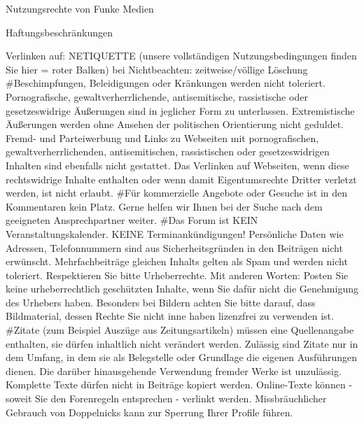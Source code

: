 Nutzungsrechte von Funke Medien 

Haftungsbeschränkungen



Verlinken auf:
NETIQUETTE (unsere vollständigen Nutzungsbedingungen finden Sie hier = roter Balken) 
bei Nichtbeachten: zeitweise/völlige Löschung
    #Beschimpfungen, Beleidigungen oder Kränkungen werden nicht toleriert.
    Pornografische, gewaltverherrlichende, antisemitische, rassistische oder gesetzeswidrige Äußerungen sind in jeglicher Form zu unterlassen. Extremistische Äußerungen werden ohne Ansehen der politischen Orientierung nicht geduldet.
    Fremd- und Parteiwerbung und Links zu Webseiten mit pornografischen, gewaltverherrlichenden, antisemitischen, rassistischen oder gesetzeswidrigen Inhalten sind ebenfalls nicht gestattet.
    Das Verlinken auf Webseiten, wenn diese rechtswidrige Inhalte enthalten oder wenn damit Eigentumsrechte Dritter verletzt werden, ist nicht erlaubt.
    #Für kommerzielle Angebote oder Gesuche ist in den Kommentaren kein Platz. Gerne helfen wir Ihnen bei der Suche nach dem geeigneten Ansprechpartner weiter.
    #Das Forum ist KEIN Veranstaltungskalender. KEINE Terminankündigungen!
    Persönliche Daten wie Adressen, Telefonnummern sind aus Sicherheitsgründen in den Beiträgen nicht erwünscht.
    Mehrfachbeiträge gleichen Inhalts gelten als Spam und werden nicht toleriert.
    Respektieren Sie bitte Urheberrechte. Mit anderen Worten: Posten Sie keine urheberrechtlich geschützten Inhalte, wenn Sie dafür nicht die Genehmigung des Urhebers haben. Besonders bei Bildern achten Sie bitte darauf, dass Bildmaterial, dessen Rechte Sie nicht inne haben lizenzfrei zu verwenden ist.
    #Zitate (zum Beispiel Auszüge aus Zeitungsartikeln) müssen eine Quellenangabe enthalten, sie dürfen inhaltlich nicht verändert werden. Zulässig sind Zitate nur in dem Umfang, in dem sie als Belegstelle oder Grundlage die eigenen Ausführungen dienen. Die darüber hinausgehende Verwendung fremder Werke ist unzulässig. Komplette Texte dürfen nicht in Beiträge kopiert werden. Online-Texte können - soweit Sie den Forenregeln entsprechen - verlinkt werden.
    Missbräuchlicher Gebrauch von Doppelnicks kann zur Sperrung Ihrer Profile führen.
